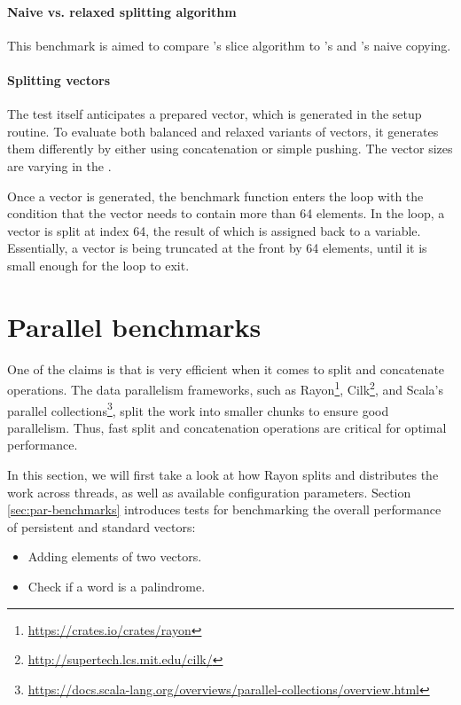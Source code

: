\paragraph{Naive vs. relaxed splitting algorithm}
This benchmark is aimed to compare \rrbvec{}'s slice algorithm to \stdvec{}'s and \rbvec{}'s naive copying.

\paragraph{Splitting vectors}
The test itself anticipates a prepared vector, which is generated in the setup routine. To evaluate both balanced and relaxed variants of vectors, it generates them differently by either using concatenation or simple pushing. The vector sizes are varying in the \range{[128, \kilo{40}]}.

Once a vector is generated, the benchmark function enters the loop with the condition that the vector needs to contain more than 64 elements. In the loop, a vector is split at index 64, the result of which is assigned back to a variable. Essentially, a vector is being truncated at the front by 64 elements, until it is small enough for the loop to exit.

\section{Parallel benchmarks}
One of the claims is that \rrbvec{} is very efficient when it comes to split and concatenate operations. The data parallelism frameworks, such as Rayon\footnote{\url{https://crates.io/crates/rayon}}, Cilk\footnote{\url{http://supertech.lcs.mit.edu/cilk/}}, and Scala's parallel collections\footnote{\url{https://docs.scala-lang.org/overviews/parallel-collections/overview.html}}, split the work into smaller chunks to ensure good parallelism. Thus, fast split and concatenation operations are critical for optimal performance.

In this section, we will first take a look at how Rayon splits and distributes the work across threads, as well as available configuration parameters. Section \ref{sec:par-benchmarks} introduces tests for benchmarking the overall performance of persistent and standard vectors:

\begin{itemize}
    \item Adding elements of two vectors.
    \item Check if a word is a palindrome.
\end{itemize}

